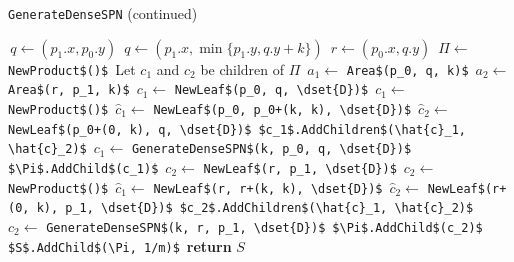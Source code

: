 \documentclass{amsart}
\theoremstyle{plain}
\numberwithin{equation}{section}
\newcommand{\mcode}[1]{\lstinline[mathescape]!#1!}
\newcommand{\dset}[1]{\mathcal{#1}}
\begin{document}
\begin{algorithm}[H]
  \caption*{\mcode{GenerateDenseSPN} (continued)}
  \begin{algorithmic}[1]
    \State\,$q \gets (p_1.x, p_0.y)$
        \State\,$q \gets (p_1.x, \min\{p_1.y, q.y + k\})$
        \State\,$r \gets (p_0.x, q.y)$
        \State\,$\Pi \gets$ \mcode{NewProduct$()$}
        \State\,Let $c_1$ and $c_2$ be children of $\Pi$
        \State\,$a_1 \gets$ \mcode{Area$(p_0, q, k)$}
        \State\,$a_2 \gets$ \mcode{Area$(r, p_1, k)$}
          \State\,$c_1 \gets$ \mcode{NewLeaf$(p_0, q, \dset{D})$}
          \State\,$c_1 \gets$ \mcode{NewProduct$()$}
          \State\,$\hat{c}_1 \gets$ \mcode{NewLeaf$(p_0, p_0+(k, k), \dset{D})$}
          \State\,$\hat{c}_2 \gets$ \mcode{NewLeaf$(p_0+(0, k), q, \dset{D})$}
          \State\,\mcode{$c_1$.AddChildren$(\hat{c}_1, \hat{c}_2)$}
        \Else%
          \State\,$c_1 \gets$ \mcode{GenerateDenseSPN$(k, p_0, q, \dset{D})$}
        \EndIf%
        \State\,\mcode{$\Pi$.AddChild$(c_1)$}
          \State\,$c_2 \gets$ \mcode{NewLeaf$(r, p_1, \dset{D})$}
          \State\,$c_2 \gets$ \mcode{NewProduct$()$}
          \State\,$\hat{c}_1 \gets$ \mcode{NewLeaf$(r, r+(k, k), \dset{D})$}
          \State\,$\hat{c}_2 \gets$ \mcode{NewLeaf$(r+(0, k), p_1, \dset{D})$}
          \State\,\mcode{$c_2$.AddChildren$(\hat{c}_1, \hat{c}_2)$}
        \Else%
          \State\,$c_2 \gets$ \mcode{GenerateDenseSPN$(k, r, p_1, \dset{D})$}
        \EndIf%
        \State\,\mcode{$\Pi$.AddChild$(c_2)$}
        \State\,\mcode{$S$.AddChild$(\Pi, 1/m)$}
      \EndFor%
    \EndIf%
    \State\,\textbf{return} $S$
  \end{algorithmic}
\end{algorithm}



\printbibliography[]
\end{document}
